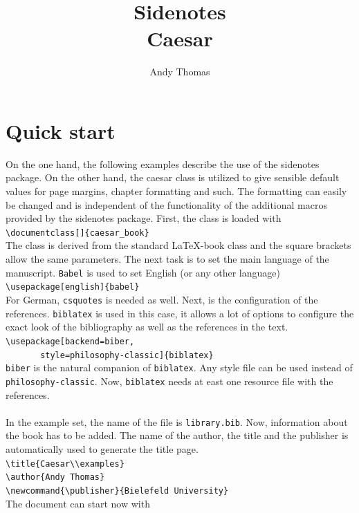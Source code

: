 \documentclass{caesar_book}
\title{Sidenotes\\Caesar}
\author{Andy Thomas}
\begin{document}
\frontmatter
\maketitlepage
\tableofcontents
\mainmatter
\chapter{Quick start}
On the one hand, the following examples describe the use of the sidenotes package. On the other hand, the caesar class is utilized to give sensible default values for page margins, chapter formatting and such. The formatting can easily be changed and is independent of the functionality of the additional macros provided by the sidenotes package. First, the class is loaded with\\
\verb+\documentclass[]{caesar_book}+\\
The class is derived from the standard \LaTeX-book class and the square brackets allow the same parameters. The next task is to set the main language of the manuscript. \texttt{Babel} is used to set English (or any other language)\\
\verb+\usepackage[english]{babel}+\\
For German, \texttt{csquotes} is needed as well. Next, is the configuration of the references. \texttt{biblatex} is used in this case, it allows a lot of options to configure the exact look of the bibliography as well as the references in the text.\\
\verb+\usepackage[backend=biber,+\\
\verb+       style=philosophy-classic]{biblatex}+\\
\texttt{biber} is the natural companion of \texttt{biblatex}. Any style file can be used instead of \texttt{philosophy-classic}. Now, \texttt{biblatex} needs at east one resource file with the references.\\
\verb++\\
In the example set, the name of the file is \texttt{library.bib}. Now, information about the book has to be added. The name of the author, the title and the publisher is automatically used to generate the title page.\\
\verb+\title{Caesar\\examples}+\\
\verb+\author{Andy Thomas}+\\
\verb+\newcommand{\publisher}{Bielefeld University}+\\
The document can start now with\\
\end{document}
